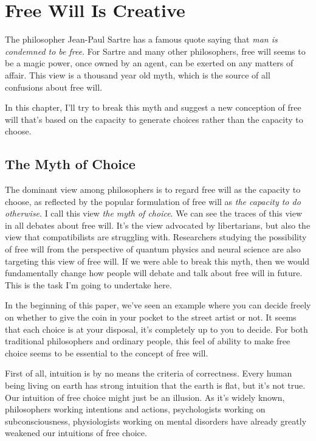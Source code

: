 \section{Free Will Is Creative}

The philosopher Jean-Paul Sartre has a famous quote saying that \emph{man is condemned to be free}. For Sartre and many other philosophers, free will seems to be a magic power, once owned by an agent, can be exerted on any matters of affair. This view is a thousand year old myth, which is the source of all confusions about free will.

In this chapter, I'll try to break this myth and suggest a new conception of free will that's based on the capacity to generate choices rather than the capacity to choose.


\subsection{The Myth of Choice}

The dominant view among philosophers is to regard free will as the capacity to choose, as reflected by the popular formulation of free will as \emph{the capacity to do otherwise}. I call this view \emph{the myth of choice}. We can see the traces of this view in all debates about free will. It's the view advocated by libertarians, but also the view that compatibilists are struggling with. Researchers studying the possibility of free will from the perspective of quantum physics and neural science are also targeting this view of free will. If we were able to break this myth, then we would fundamentally change how people will debate and talk about free will in future. This is the task I'm going to undertake here.

In the beginning of this paper, we've seen an example where you can decide freely on whether to give the coin in your pocket to the street artist or not. It seems that each choice is at your disposal, it's completely up to you to decide. For both traditional philosophers and ordinary people, this feel of ability to make free choice seems to be essential to the concept of free will.

First of all, intuition is by no means the criteria of correctness. Every human being living on earth has strong intuition that the earth is flat, but it's not true. Our intuition of free choice might just be an illusion. As it's widely known, philosophers working intentions and actions, psychologists working on subconsciousness, physiologists working on mental disorders have already greatly weakened our intuitions of free choice.

